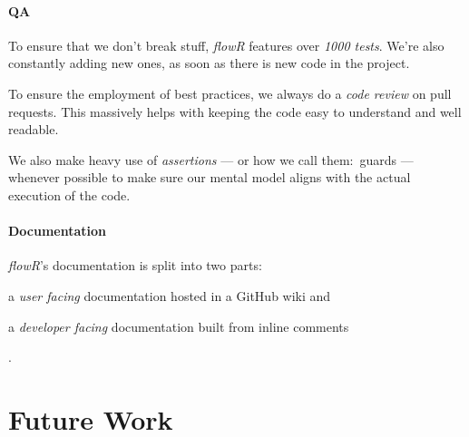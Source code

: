 \documentclass[color,coloraccent=red!60!black]{poster}
\def\flowr{\textit{flowR}}
\begin{document}
\begin{multicols}{3}
	\paragraph{QA} To ensure that we don't break stuff, \flowr{} features over
	\emph{1000 tests}. We're also constantly adding new ones, as soon as there is new
	code in the project.\par To ensure the employment of best practices, we always do a
	\emph{code review} on pull requests. This massively helps with keeping the code easy
	to understand and well readable.\par
	We also make heavy use of \emph{assertions} --- or how we call them:~guards ---
	whenever possible to make sure our mental model aligns with the actual execution of
	the code.
	\paragraph{Documentation} \flowr's documentation is split into two parts:
	\begin{enumerate*}
		\item a \emph{user facing} documentation hosted in a GitHub wiki and
		\item a \emph{developer facing} documentation built from inline comments
	\end{enumerate*}. %
	\section*{Future Work}
	\lipsum[2]
\end{multicols}
\end{document}
